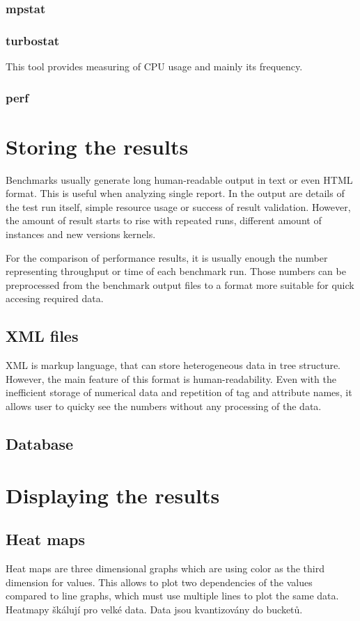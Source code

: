 \subsection{mpstat}

\subsection{turbostat}
This tool provides measuring of CPU usage and mainly its frequency.

\subsection{perf}


\chapter{Storing the results}
Benchmarks usually generate long human-readable output in text or even HTML
format. This is useful when analyzing single report. In the output are details
of the test run itself, simple resource usage or success of result validation.
However, the amount of result starts to rise with repeated runs, different
amount of instances and new versions kernels.

For the comparison of performance results, it is usually enough the number
representing throughput or time of each benchmark run. Those numbers can be
preprocessed from the benchmark output files to a format more suitable for quick
accesing required data.

\section{XML files}
XML is markup language, that can store heterogeneous data in tree structure.
However, the main feature of this format is human-readability. Even with the
inefficient storage of numerical data and repetition of tag and attribute names,
it allows user to quicky see the numbers without any processing of the data.

\section{Database}


\chapter{Displaying the results}
\section{Heat maps}
Heat maps are three dimensional graphs which are using color as the third
dimension for values. This allows to plot two dependencies of the values
compared to line graphs, which must use multiple lines to plot the same data.
Heatmapy škálují pro velké data. 
Data jsou kvantizovány do bucketů.

